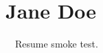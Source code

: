 \documentclass[letterpaper,11pt]{article}
\begin{document}
\section*{Jane Doe}
\faGithub\ \Mobilefone\ Resume smoke test.
\end{document}
